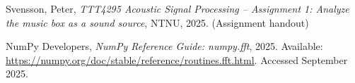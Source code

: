 
\begin{thebibliography}{9}

Svensson, Peter, \emph{TTT4295 Acoustic Signal Processing – Assignment 1: Analyze the music box as a sound source}, NTNU, 2025. (Assignment handout)

NumPy Developers, \emph{NumPy Reference Guide: numpy.fft}, 2025. Available: \url{https://numpy.org/doc/stable/reference/routines.fft.html}. Accessed September 2025.

\end{thebibliography}
